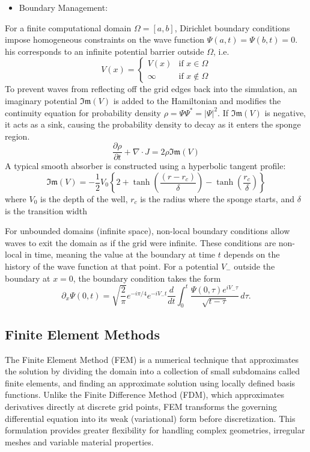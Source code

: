\documentclass[11pt]{article}
\begin{document}
\begin{itemize}
	\item 
	Boundary Management:
\end{itemize}
For a finite computational domain $\Omega = [a,b]$, Dirichlet boundary conditions impose homogeneous constraints on the wave function $\Psi(a,t) = \Psi(b,t) = 0$. his corresponds to an infinite potential barrier outside $\Omega$, i.e.
\begin{equation}
	V(x) = 
	\begin{cases} 
		V(x) & \text{if } x \in \Omega \\
		\infty & \text{if } x \notin \Omega 
	\end{cases}
\end{equation}
To prevent waves from reflecting off the grid edges back into the simulation, an imaginary potential $\mathfrak{Im}(V)$ is added to the Hamiltonian and modifies the continuity equation for probability density $\rho = \Psi \Psi^* = |\Psi|^2$. If $\mathfrak{Im}(V)$ is negative, it acts as a sink, causing the probability density to decay as it enters the sponge region.
\begin{equation}
	\frac{\partial \rho}{\partial t} + \nabla \cdot J = 2 \rho \mathfrak{Im}(V)
\end{equation}
A typical smooth absorber is constructed using a hyperbolic tangent profile:
\begin{equation}
	\mathfrak{Im}(V) = - \frac{1}{2} V_0 \left\{ 2 + \tanh \left( \frac{(r - r_c)}{\delta}  \right) - \tanh (\frac{r_c}{\delta}) \right\}
\end{equation}
 where $V_0$ is the depth of the well, $r_c$ is the radius where the sponge starts, and $\delta$ is the transition width

For unbounded domains (infinite space), non-local boundary conditions allow waves to exit the domain as if the grid were infinite. These conditions are non-local in time, meaning the value at the boundary at time $t$ depends on the history of the wave function at that point. For a potential $V_-$ outside the boundary at $x=0$, the boundary condition takes the form
\begin{equation}
	\partial_x \Psi(0,t) = \sqrt{\frac{2}{\pi}} e^{-i\pi/4} e^{-iV_- t} \frac{d}{dt} \int_0^t \frac{\Psi(0,\tau)e^{iV_- \tau}}{\sqrt{t-\tau}}\, d\tau.
\end{equation}

\subsection{Finite Element Methods}
The Finite Element Method (FEM) is a numerical technique that approximates the solution by dividing the domain into a collection of small subdomains called finite elements, and finding an approximate solution using locally defined basis functions. Unlike the Finite Difference Method (FDM), which approximates derivatives directly at discrete grid points, FEM transforms the governing differential equation into its weak (variational) form before discretization. This formulation provides greater flexibility for handling complex geometries, irregular meshes and variable material properties.
\end{document}
